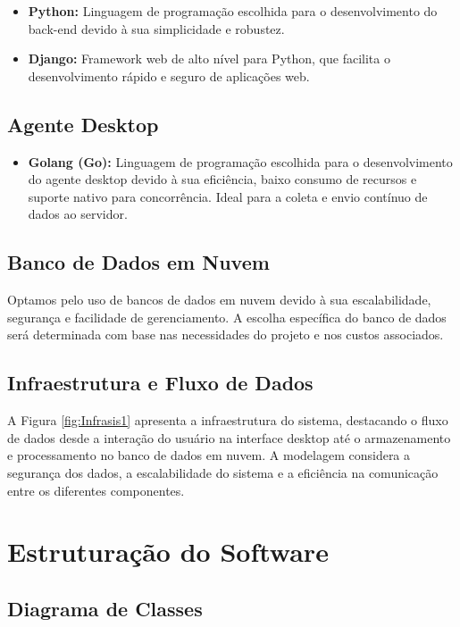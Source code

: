 \begin{itemize}
    \item \textbf{Python:} Linguagem de programação escolhida para o desenvolvimento do back-end devido à sua simplicidade e robustez.
    \item \textbf{Django:} Framework web de alto nível para Python, que facilita o desenvolvimento rápido e seguro de aplicações web.
\end{itemize}

\subsection{Agente Desktop}

\begin{itemize}
    \item \textbf{Golang (Go):} Linguagem de programação escolhida para o desenvolvimento do agente desktop devido à sua eficiência, baixo consumo de recursos e suporte nativo para concorrência. Ideal para a coleta e envio contínuo de dados ao servidor.
\end{itemize}

\subsection{Banco de Dados em Nuvem}

Optamos pelo uso de bancos de dados em nuvem devido à sua escalabilidade, segurança e facilidade de gerenciamento. A escolha específica do banco de dados será determinada com base nas necessidades do projeto e nos custos associados.

\subsection{Infraestrutura e Fluxo de Dados}

A Figura \ref{fig:Infrasis1} apresenta a infraestrutura do sistema, destacando o fluxo de dados desde a interação do usuário na interface desktop até o armazenamento e processamento no banco de dados em nuvem. A modelagem considera a segurança dos dados, a escalabilidade do sistema e a eficiência na comunicação entre os diferentes componentes.


\section{Estruturação do Software}



\subsection{Diagrama de Classes}

